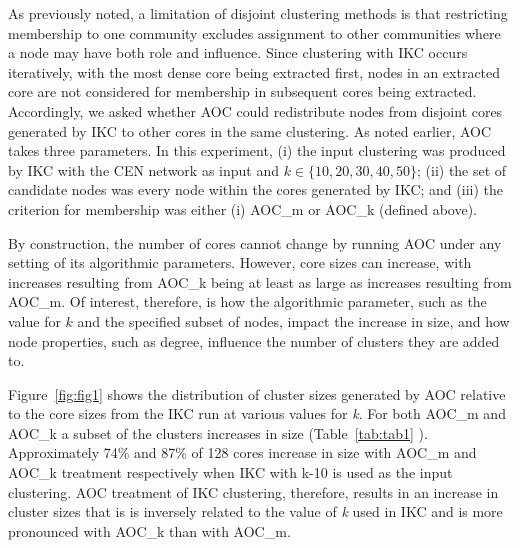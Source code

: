\documentclass[12pt, oneside]{article}   	%
\begin{document}
As previously noted, a limitation of disjoint clustering methods is that restricting membership to one community excludes assignment to other communities where a node may have both role and influence. Since clustering with IKC occurs iteratively, with the most dense core being extracted first, nodes in an extracted core are not considered for membership in subsequent cores being extracted.
Accordingly, we asked whether AOC could redistribute nodes from disjoint cores generated by IKC to other cores in the same clustering. As noted earlier, AOC takes three parameters. In this experiment, (i) the input clustering was produced by IKC with the CEN network as input and $k \in \{10, 20, 30, 40, 50\}$; (ii) the set of candidate nodes was every node within the cores generated by IKC; and (iii) the criterion for membership was either (i) AOC\_m or AOC\_k (defined above).

By construction, the number of cores cannot change by running AOC  under any setting of its algorithmic parameters. However, core sizes can increase, with increases resulting from AOC\_k being at least as large as increases resulting from AOC\_m.
Of interest, therefore, is how the algorithmic parameter, such as the value for $k$ and the specified subset of nodes, impact the increase in size, and how node properties, such as degree, influence the number of clusters they are added to.

Figure~\ref{fig:fig1} shows the distribution of cluster sizes generated by AOC relative to the core sizes from the IKC run at various values for \emph{k}. For both AOC\_m and AOC\_k a subset of the clusters increases in size (Table~\ref{tab:tab1} ).
Approximately 74\% and 87\% of  128 cores increase in size with AOC\_m and AOC\_k treatment respectively when IKC with k-10 is used as the input clustering. AOC treatment of IKC clustering, therefore, results in an increase in cluster sizes that is is inversely related to the value of \emph{k} used in IKC and is more pronounced with AOC\_k than with AOC\_m. 
\end{document}
